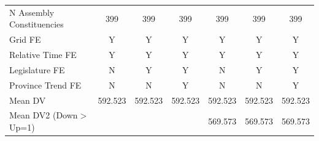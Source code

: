 {\begin{tabular}{l*{6}{c}}
N Assembly Constituencies&         399         &         399         &         399         &         399         &         399         &         399         \\
Grid FE     &           Y         &           Y         &           Y         &           Y         &           Y         &           Y         \\
Relative Time FE&           Y         &           Y         &           Y         &           Y         &           Y         &           Y         \\
Legislature FE&           N         &           Y         &           Y         &           N         &           Y         &           Y         \\
Province Trend FE&           N         &           N         &           Y         &           N         &           N         &           Y         \\
Mean DV     &     592.523         &     592.523         &     592.523         &     592.523         &     592.523         &     592.523         \\
Mean DV2 (Down$>$Up=1)&                     &                     &                     &     569.573         &     569.573         &     569.573         \\
\hline
\end{tabular}
}
